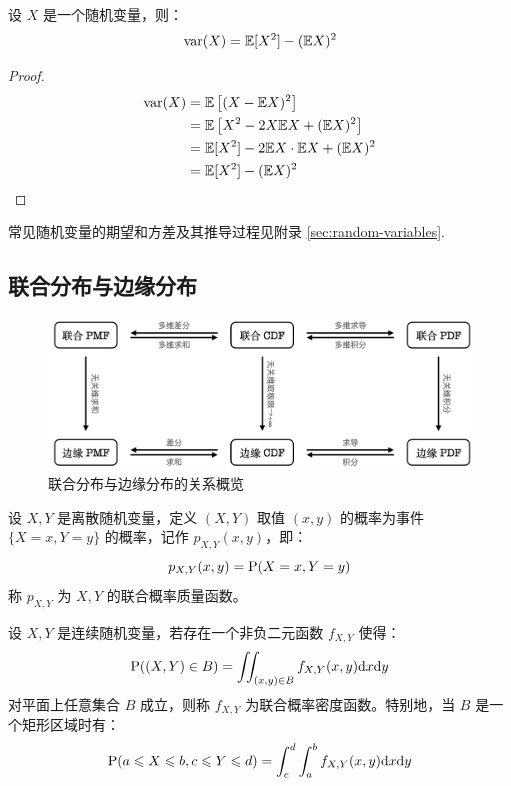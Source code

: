 \begin{theorem}[用矩表达方差]
设 $X$ 是一个随机变量，则：
\[
\mathrm{var}(X)=\mathbb{E}[X^2]-(\mathbb{E} X)^2
\]
\end{theorem}
\begin{proof}
\begin{align*}
\mathrm{var}(X)&=\mathbb{E}\left[(X-\mathbb{E} X)^2\right]\\
&=\mathbb{E}\left[X^2-2X\mathbb{E} X+(\mathbb{E} X)^2\right]\\
&=\mathbb{E}[X^2]-2 \mathbb{E} X\cdot \mathbb{E} X+(\mathbb{E} X)^2\\
&=\mathbb{E}[X^2]-(\mathbb{E} X)^2
\end{align*}
\end{proof}

\begin{example}
常见随机变量的期望和方差及其推导过程见附录 \ref{sec:random-variables}.
\end{example}


\subsection{联合分布与边缘分布}

\begin{figure}[H]
    \centering
    \includegraphics[width=0.8\linewidth]{figs/联合分布与边缘分布.png}
    \caption{联合分布与边缘分布的关系概览}
    \label{fig:union-marginal}
\end{figure}

\begin{definition}[联合概率质量函数]
设 $X,Y$ 是离散随机变量，定义 $(X,Y)$ 取值 $(x,y)$ 的概率为事件 $\{X=x,Y=y\}$ 的概率，记作 $p_{X,Y}(x,y)$，即：\[p_{X,Y}(x,y)=\mathrm{P}(X=x,Y=y)\]
称 $p_{X,Y}$ 为 $X,Y$ 的联合概率质量函数。
\end{definition}

\begin{definition}[联合概率密度函数]
设 $X,Y$ 是连续随机变量，若存在一个非负二元函数 $f_{X,Y}$ 使得：
\[
\mathrm{P}((X,Y)\in B)=\iint_{(x,y)\in B}f_{X,Y}(x,y)\mathrm dx\mathrm dy
\]
对平面上任意集合 $B$ 成立，则称 $f_{X,Y}$ 为联合概率密度函数。特别地，当 $B$ 是一个矩形区域时有：
\[
\mathrm{P}(a\leqslant X\leqslant b,c\leqslant Y\leqslant d)=\int_c^d\int_a^b f_{X,Y}(x,y)\mathrm dx\mathrm dy
\]
\end{definition}

